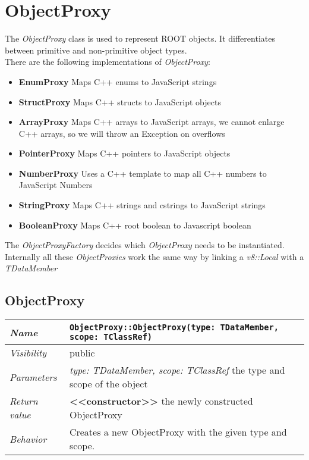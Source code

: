 \chapter{ObjectProxy}
The \textit{ObjectProxy} class is used to represent ROOT objects. It differentiates between primitive and non-primitive object types.\\
There are the following implementations of \textit{ObjectProxy}:
\begin{itemize}
\item \textbf{EnumProxy} Maps C++ enums to JavaScript strings
\item \textbf{StructProxy} Maps C++ structs to JavaScript objects
\item \textbf{ArrayProxy} Maps C++ arrays to JavaScript arrays, we cannot enlarge C++ arrays, so we will throw an Exception on overflows
\item \textbf{PointerProxy} Maps C++ pointers to JavaScript objects
\item \textbf{NumberProxy} Uses a C++ template to map all C++ numbers to JavaScript Numbers
\item \textbf{StringProxy} Maps C++ strings and cstrings to JavaScript strings
\item \textbf{BooleanProxy} Maps C++ root boolean to Javascript boolean
\end{itemize}
The \textit{ObjectProxyFactory} decides which \textit{ObjectProxy} needs to be instantiated.
Internally all these \textit{ObjectProxies} work the same way by linking a \textit{v8::Local} with a \textit{TDataMember}
\section{ObjectProxy}
\begin{longtable}{p{3cm} @{\hskip 1cm} p{12cm}}
 \hline
\textit{Name} & \texttt{ObjectProxy::ObjectProxy(type: TDataMember, scope: TClassRef)}\\
\hline
 \textit{Visibility} & public\\
\hline
\textit{Parameters} & \textit{type: TDataMember, scope: TClassRef} the type and scope of the object\\
\hline
\textit{Return value} & \textbf{<<constructor>>} the newly constructed ObjectProxy\\
  \hline
  \textit{Behavior} & Creates a new ObjectProxy with the given type and scope.\\
\hline
\end{longtable} \pagebreak
